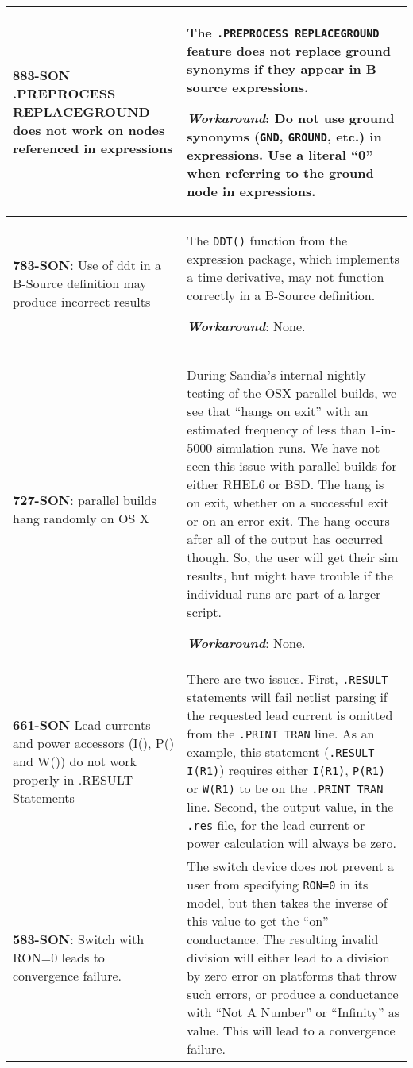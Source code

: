 {\begin{longtable}[h] {>{\raggedright\small}m{2in}|>{\raggedright\let\\\tabularnewline\small}m{3.5in}}
\textbf{883-SON} .PREPROCESS REPLACEGROUND does not work on nodes referenced
in expressions & The \texttt{.PREPROCESS REPLACEGROUND} feature does
not replace ground synonyms if they appear in B source expressions.

\textbf{\textit{Workaround}}: Do not use ground synonyms (\texttt{GND},
\texttt{GROUND}, etc.) in expressions.  Use a literal ``0'' when
referring to the ground node in expressions.\\ \hline

\textbf{783-SON}: Use of ddt in a B-Source definition may produce incorrect
results & The \texttt{DDT()} function from the \Xyce{} expression
package, which implements a time derivative, may not function
correctly in a B-Source definition.

\textbf{\textit{Workaround}}: None. \\ \hline

\textbf{727-SON}: \Xyce{} parallel builds hang randomly on OS X & During
Sandia's internal nightly testing of the OSX parallel builds, we see
that \Xyce{} ``hangs on exit'' with an estimated frequency of less
than 1-in-5000 simulation runs.  We have not seen this issue with
parallel builds for either RHEL6 or BSD.  The hang is on exit, whether
on a successful exit or on an error exit.  The hang occurs after all
of the \Xyce{} output has occurred though.  So, the user will get
their sim results, but might have trouble if the individual \Xyce{}
runs are part of a larger script.

\textbf{\textit{Workaround}}: None. \\ \hline

\textbf{661-SON} Lead currents and power accessors (I(), P() and W()) do
not work properly in .RESULT Statements & There are two issues.
First, \texttt{.RESULT} statements will fail netlist parsing if the
requested lead current is omitted from the \texttt{.PRINT TRAN}
line.  As an example, this statement (\texttt{.RESULT I(R1)}) requires
either \texttt{I(R1)},
\texttt{P(R1)} or \texttt{W(R1)} to be on the \texttt{.PRINT TRAN} line.
Second, the output value, in the \texttt{.res} file, for the lead
current or power calculation will always be zero.
\\ \hline

\textbf{583-SON}: Switch with RON=0 leads to convergence failure. &
The switch device does not prevent a user from
specifying \texttt{RON=0} in its model, but then takes the inverse of
this value to get the ``on'' conductance.  The resulting invalid
division will either lead to a division by zero error on platforms
that throw such errors, or produce a conductance with ``Not A Number''
or ``Infinity'' as value.  This will lead to a convergence failure.


\end{longtable}}
